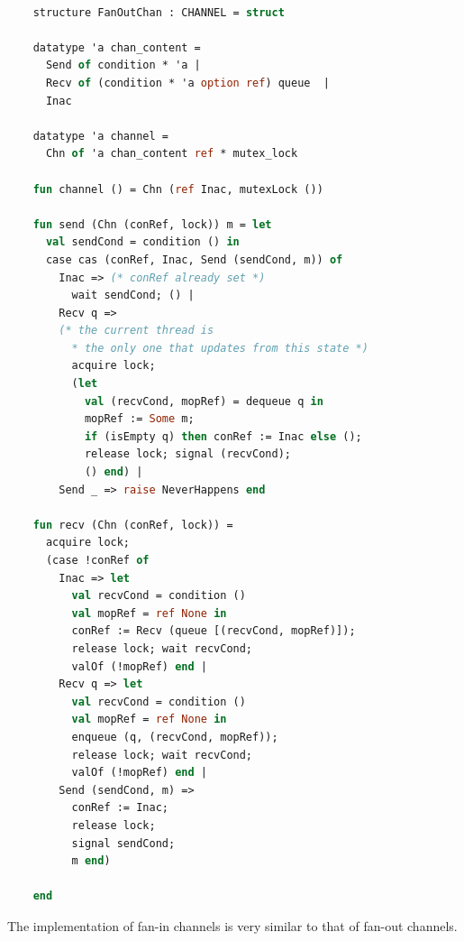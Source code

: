 \documentclass{article}
\begin{document}
  \begin{lstlisting}[language=ML, escapechar=\%]

    structure FanOutChan : CHANNEL = struct

    datatype 'a chan_content =
      Send of condition * 'a |
      Recv of (condition * 'a option ref) queue  |
      Inac

    datatype 'a channel =
      Chn of 'a chan_content ref * mutex_lock

    fun channel () = Chn (ref Inac, mutexLock ())

    fun send (Chn (conRef, lock)) m = let
      val sendCond = condition () in
      case cas (conRef, Inac, Send (sendCond, m)) of
        Inac => (* conRef already set *)
          wait sendCond; () |
        Recv q => 
        (* the current thread is
          * the only one that updates from this state *)
          acquire lock;
          (let
            val (recvCond, mopRef) = dequeue q in
            mopRef := Some m; 
            if (isEmpty q) then conRef := Inac else (); 
            release lock; signal (recvCond);
            () end) |
        Send _ => raise NeverHappens end

    fun recv (Chn (conRef, lock)) =
      acquire lock;
      (case !conRef of
        Inac => let
          val recvCond = condition ()
          val mopRef = ref None in
          conRef := Recv (queue [(recvCond, mopRef)]);
          release lock; wait recvCond;
          valOf (!mopRef) end |
        Recv q => let
          val recvCond = condition () 
          val mopRef = ref None in
          enqueue (q, (recvCond, mopRef));
          release lock; wait recvCond;
          valOf (!mopRef) end |
        Send (sendCond, m) =>
          conRef := Inac;
          release lock;
          signal sendCond;
          m end) 

    end 
  \end{lstlisting}

The implementation of fan-in channels is very similar to that of fan-out channels.
\end{document}
